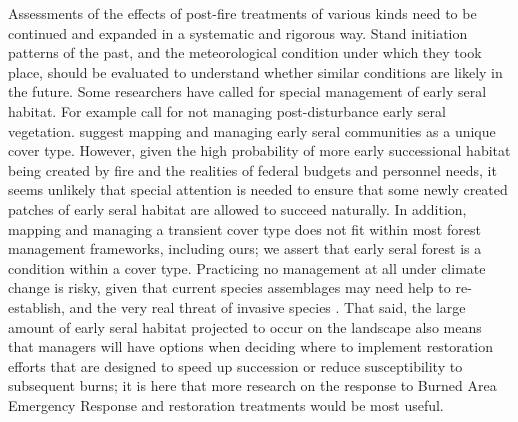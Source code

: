 Assessments of the effects of post-fire treatments of various kinds need to be continued and expanded in a systematic and rigorous way. Stand initiation patterns of the past, and the meteorological condition under which they took place, should be evaluated to understand whether similar conditions are likely in the future. Some researchers have called for special management of early seral habitat. For example \citet{Dellasala2014} call for not managing post-disturbance early seral vegetation. \citet{Swanson2011} suggest mapping and managing early seral communities as a unique cover type. However, given the high probability of more early successional habitat being created by fire and the realities of federal budgets and personnel needs, it seems unlikely that special attention is needed to ensure that some newly created patches of early seral habitat are allowed to succeed naturally. In addition, mapping and managing a transient cover type does not fit within most forest management frameworks, including ours; we assert that early seral forest is a condition within a cover type. Practicing no management at all under climate change is risky, given that current species assemblages may need help to re-establish, and the very real threat of invasive species \citep{Stephens2010}. That said, the large amount of early seral habitat projected to occur on the landscape also means that managers will have options when deciding where to implement restoration efforts that are designed to speed up succession or reduce susceptibility to subsequent burns; it is here that more research on the response to Burned Area Emergency Response and restoration treatments would be most useful.


